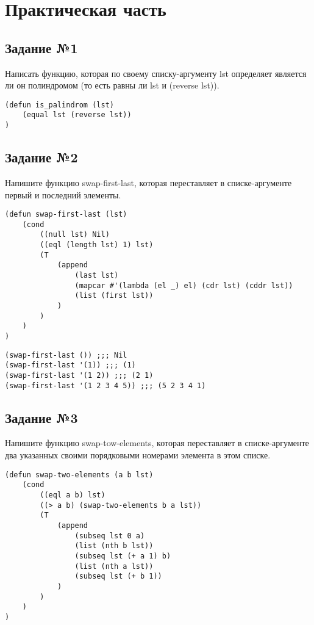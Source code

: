 \chapter{Практическая часть}

\section{Задание №1}

Написать функцию, которая по своему списку-аргументу lst определяет является ли
он полиндромом (то есть равны ли lst и (reverse lst)).

\begin{lstlisting}
(defun is_palindrom (lst)
    (equal lst (reverse lst))
)
\end{lstlisting}

\section{Задание №2}

Напишите функцию swap-first-last, которая переставляет в списке-аргументе
первый и последний элементы.

\begin{lstlisting}
(defun swap-first-last (lst)
    (cond
        ((null lst) Nil)
        ((eql (length lst) 1) lst)
        (T
            (append
                (last lst)
                (mapcar #'(lambda (el _) el) (cdr lst) (cddr lst))
                (list (first lst))
            )
        )
    )
)
\end{lstlisting}

\begin{lstlisting}
(swap-first-last ()) ;;; Nil
(swap-first-last '(1)) ;;; (1)
(swap-first-last '(1 2)) ;;; (2 1)
(swap-first-last '(1 2 3 4 5)) ;;; (5 2 3 4 1)
\end{lstlisting}

\section{Задание №3}

Напишите функцию swap-tow-elements, которая переставляет в списке-аргументе
два указанных своими порядковыми номерами элемента в этом списке.

\begin{lstlisting}
(defun swap-two-elements (a b lst)
    (cond
        ((eql a b) lst)
        ((> a b) (swap-two-elements b a lst))
        (T
            (append
                (subseq lst 0 a)
                (list (nth b lst))
                (subseq lst (+ a 1) b)
                (list (nth a lst))
                (subseq lst (+ b 1))
            )
        )
    )
)
\end{lstlisting}

